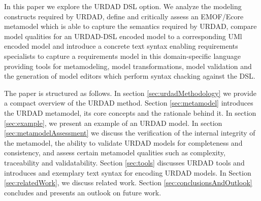 In this paper we explore the URDAD DSL option. We analyze the modeling constructs required by URDAD, define and critically assess an EMOF/Ecore metamodel which is able to capture the semantics required by URDAD, compare model qualities for an URDAD-DSL encoded model to a corresponding UMl encoded model and introduce a concrete text syntax enabling requirements specialists to capture a requirements model in this domain-specific language providing tools for metamodeling, model transformations, model validation and the generation of model editors which perform syntax chacking against the DSL.

The paper is structured as follows. In section \ref{sec:urdadMethodology} we provide a compact overview of the URDAD method. Section \ref{sec:metamodel} introduces the URDAD metamodel, its core concepts and the rationale behind it. In section \ref{sec:example}, we present an example of an URDAD model. In section \ref{sec:metamodelAssessment} we discuss the verification of the internal integrity of the metamodel, the ability to validate URDAD models for completeness and consistency, and assess certain metamodel qualities such as complexity, traceability and validatability. Section \ref{sec:tools} discusses URDAD tools and introduces and exemplary text syntax for encoding URDAD models. In Section \ref{sec:relatedWork}, we discuss related work. Section \ref{sec:conclusionsAndOutlook} concludes and presents an outlook on future work.
